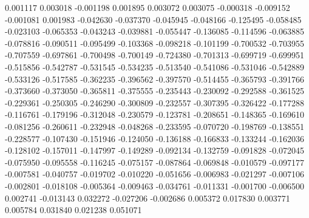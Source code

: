 0.001117
0.003018
-0.001198
0.001895
0.003072
0.003075
-0.000318
-0.009152
-0.001081
0.001983
-0.042630
-0.037370
-0.045945
-0.048166
-0.125495
-0.058485
-0.023103
-0.065353
-0.043243
-0.039881
-0.055447
-0.136085
-0.114596
-0.063885
-0.078816
-0.090511
-0.095499
-0.103368
-0.098218
-0.101199
-0.700532
-0.703955
-0.707559
-0.697861
-0.700498
-0.700149
-0.724380
-0.701313
-0.699719
-0.699951
-0.515856
-0.542787
-0.531545
-0.534235
-0.513540
-0.541086
-0.531046
-0.542889
-0.533126
-0.517585
-0.362235
-0.396562
-0.397570
-0.514455
-0.365793
-0.391766
-0.373660
-0.373050
-0.365811
-0.375555
-0.235443
-0.230092
-0.292588
-0.361525
-0.229361
-0.250305
-0.246290
-0.300809
-0.232557
-0.307395
-0.326422
-0.177288
-0.116761
-0.179196
-0.312048
-0.230579
-0.123781
-0.208651
-0.148365
-0.169610
-0.081256
-0.260611
-0.232948
-0.048268
-0.233595
-0.070720
-0.198769
-0.138551
-0.228577
-0.107430
-0.151946
-0.124050
-0.136188
-0.166833
-0.133244
-0.162036
-0.128102
-0.157011
-0.147997
-0.149289
-0.092134
-0.132759
-0.091828
-0.072045
-0.075950
-0.095558
-0.116245
-0.075157
-0.087864
-0.069848
-0.010579
-0.097177
-0.007581
-0.040757
-0.019702
-0.010220
-0.051656
-0.006983
-0.021297
-0.007106
-0.002801
-0.018108
-0.005364
-0.009463
-0.034761
-0.011331
-0.001700
-0.006500
0.002741
-0.013143
0.032272
-0.027206
-0.002686
0.005372
0.017830
0.003771
0.005784
0.031840
0.021238
0.051071
